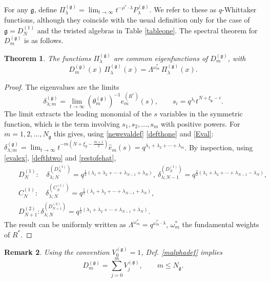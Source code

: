 \documentclass[12pt]{amsart}
\newtheorem{thm}{Theorem}[section]
\newtheorem{remark}[thm]{Remark}
\newcommand{\g}{{\mathfrak{g}}}
\numberwithin{equation}{section}
\begin{document}
For any $\g$, define
$\Pi_\lambda^{(\g)}=\lim_{t\to \infty} t^{-\rho^*\cdot\lambda} P_\lambda^{(\g)}$.
We refer to these as $q$-Whittaker functions, although they coincide with the usual definition only for the 
case of $\g=D_N^{(1)}$ and the twisted algebras in Table \ref{tableone}. The spectral theorem for $D_m^{(\g)}$ is as follows.
\begin{thm}\label{qwithakthm}
The functions $\Pi^{(\g)}_\lambda$ are common eigenfunctions of $D_m^{(\g)}$, with
$$ D_{m}^{(\g)}(x)\, \Pi^{(\g)}_\lambda(x) =\Lambda^{\omega_m^*} \,  \Pi^{(\g)}_\lambda(x).$$
%
\end{thm}
\begin{proof}
The eigenvalues are  the limits
$$\delta_{\lambda;m}^{(\g)}=\lim_{t\to \infty} (\theta_m^{(\g)})^{-1} {\hat e}_m^{(R^*)}(s), \qquad s_i=q^{\lambda_i} t^{N+\xi_\g-i}.$$
The limit  extracts the leading monomial of the $s$ variables in the symmetric function, which is the term involving $s_1,s_2,...,s_m$ with positive powers.
For $m=1,2,...,N_\g$ this gives, using \eqref{newevaldef} \eqref{defthone} and \eqref{Eval}:
$\delta_{\lambda;m}^{(\g)}=\lim_{t\to \infty} t^{-m(N+\xi_g-\frac{m+1}{2})} {\hat e}_m(s)=q^{\lambda_1+\lambda_2+\cdots+\lambda_m}$.
By inspection, using \eqref{evalex}, \eqref{defthtwo} and \eqref{restofehat}, 
\begin{eqnarray*}
&&D_N^{(1)}: \quad \delta_{\lambda;N}^{(D_{N}^{(1)})}=q^{\frac{1}{2}(\lambda_1+\lambda_2+\cdots+\lambda_{N-1}+\lambda_N)},\ 
\delta_{\lambda;N-1}^{(D_{N}^{(1)})}=q^{\frac{1}{2}(\lambda_1+\lambda_2+\cdots+\lambda_{N-1}-\lambda_N)},\\
&&C_N^{(1)}: \quad \delta_{\lambda;N}^{(C_N^{(1)})}=q^{\frac{1}{2}(\lambda_1+\lambda_2+\cdots+\lambda_{N-1}+\lambda_N)},\\
&&D_{N+1}^{(2)}: \delta_{\lambda;N}^{(D_{N+1}^{(2)})} =q^{\frac{1}{2}(\lambda_1+\lambda_2+\cdots+\lambda_{N-1}+\lambda_N)}.
\end{eqnarray*}
The result can be uniformly written as $\Lambda^{\omega_m^*}=q^{\omega_m^*\cdot\lambda}$,  $\omega_m^*$ the fundamental weights of $R^*$.
\end{proof}


\begin{remark} 
Using the convention $V_0^{(\g)}=1$, Def. \ref{malphadef} implies
\begin{equation}\label{vanD} D_{m}^{(\g)}= \sum_{j=0}^m V_j^{(\g)},  \qquad m\leq N_\g.\end{equation}
\end{remark}
%
%
%
%
%
%
%
%
%
%
%
%
%
%
%
%
%
%
%
%
%
%
%
%
%
%
%
%
%
\end{document}
